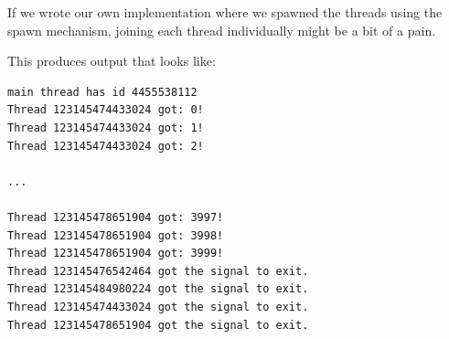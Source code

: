 If we wrote our own implementation where we spawned the threads using the spawn mechanism, joining each thread individually might be a bit of a pain. 

This produces output that looks like:

\begin{verbatim}
main thread has id 4455538112
Thread 123145474433024 got: 0!
Thread 123145474433024 got: 1!
Thread 123145474433024 got: 2!

...

Thread 123145478651904 got: 3997!
Thread 123145478651904 got: 3998!
Thread 123145478651904 got: 3999!
Thread 123145476542464 got the signal to exit.
Thread 123145484980224 got the signal to exit.
Thread 123145474433024 got the signal to exit.
Thread 123145478651904 got the signal to exit.
\end{verbatim}






